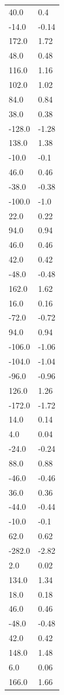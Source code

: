 \begin{longtable}{ll}
40.0 & 0.4 \\
-14.0 & -0.14 \\
172.0 & 1.72 \\
48.0 & 0.48 \\
116.0 & 1.16 \\
102.0 & 1.02 \\
84.0 & 0.84 \\
38.0 & 0.38 \\
-128.0 & -1.28 \\
138.0 & 1.38 \\
-10.0 & -0.1 \\
46.0 & 0.46 \\
-38.0 & -0.38 \\
-100.0 & -1.0 \\
22.0 & 0.22 \\
94.0 & 0.94 \\
46.0 & 0.46 \\
42.0 & 0.42 \\
-48.0 & -0.48 \\
162.0 & 1.62 \\
16.0 & 0.16 \\
-72.0 & -0.72 \\
94.0 & 0.94 \\
-106.0 & -1.06 \\
-104.0 & -1.04 \\
-96.0 & -0.96 \\
126.0 & 1.26 \\
-172.0 & -1.72 \\
14.0 & 0.14 \\
4.0 & 0.04 \\
-24.0 & -0.24 \\
88.0 & 0.88 \\
-46.0 & -0.46 \\
36.0 & 0.36 \\
-44.0 & -0.44 \\
-10.0 & -0.1 \\
62.0 & 0.62 \\
-282.0 & -2.82 \\
2.0 & 0.02 \\
134.0 & 1.34 \\
18.0 & 0.18 \\
46.0 & 0.46 \\
-48.0 & -0.48 \\
42.0 & 0.42 \\
148.0 & 1.48 \\
6.0 & 0.06 \\
166.0 & 1.66 \\

\end{longtable}
